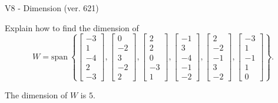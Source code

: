 \begin{exercise}
  \begin{exerciseTitle}V8 - Dimension (ver. 621)\end{exerciseTitle}
  \begin{exerciseStatement}
    Explain how to find the dimension of 
\[W=\mathrm{span}\ \left\{\left[\begin{array}{r}
-3 \\
1 \\
-4 \\
2 \\
-3
\end{array}\right] , \left[\begin{array}{r}
0 \\
-2 \\
3 \\
-2 \\
2
\end{array}\right] , \left[\begin{array}{r}
2 \\
2 \\
0 \\
-3 \\
1
\end{array}\right] , \left[\begin{array}{r}
-1 \\
3 \\
-4 \\
-1 \\
-2
\end{array}\right] , \left[\begin{array}{r}
2 \\
-2 \\
-1 \\
3 \\
-2
\end{array}\right] , \left[\begin{array}{r}
-3 \\
1 \\
-1 \\
1 \\
0
\end{array}\right]\right\}.\]



  \end{exerciseStatement}
  \begin{exerciseAnswer}
   The dimension of \(W\) is  \(5\).
  


  \end{exerciseAnswer}
\end{exercise}